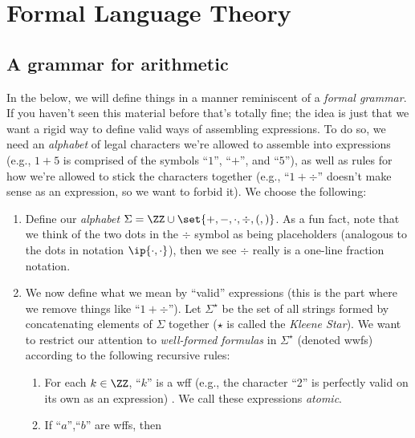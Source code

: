 \chapter{Formal Language Theory}
\section{A grammar for arithmetic}
\begin{example}
  In the below, we will define things in a manner reminiscent of a
  \emph{formal grammar}. If you haven't seen this material before
  that's totally fine; the idea is just that we want a rigid way to
  define valid ways of assembling expressions. To do so, we need an
  \emph{alphabet} of legal characters we're allowed to assemble into
  expressions (e.g., $1 + 5$ is comprised of the symbols ``$1$'',
  ``$+$'', and ``$5$''), as well as rules for how we're allowed to
  stick the characters together (e.g., ``$1 +\div$'' doesn't make
  sense as an expression, so we want to forbid it). We choose the
  following:
  \begin{enumerate}
    \item Define our \emph{alphabet} $\Sigma = \ZZ \cup \set{+, -,
        \cdot, \div, (, )}$. As a fun fact, note that we think of the
      two dots in the $\div$ symbol as being placeholders (analogous
      to the dots in notation $\ip{\cdot, \cdot}$), then we see $\div$
      really is a one-line fraction notation.
    \item We now define what we mean by ``valid'' expressions (this is
      the part where we remove things like ``$1 + \div$''). Let
      $\Sigma^\star$ be the set of all strings formed by concatenating
      elements of $\Sigma$ together ($\star$ is called the
      \emph{Kleene Star}). We want to restrict our attention to
      \emph{well-formed formulas} in $\Sigma^\star$ (denoted wwfs)
      according to the following recursive rules:
      \begin{enumerate}[label=(\alph*)]
        \item For each $ k \in \ZZ$, %
          ``$k$'' is a
          wff (e.g., the character ``2'' is perfectly valid on its own
          as an expression)%
          . We call these expressions \emph{atomic}.
        \item If ``$a$'',``$b$'' are wffs, then
          \begin{enumerate}[label=\roman*)]

\end{enumerate}
\end{enumerate}
\end{enumerate}
\end{example}
